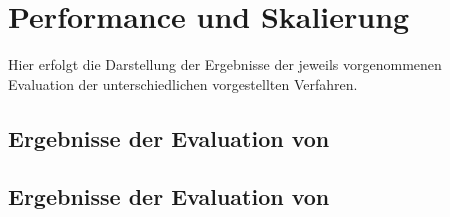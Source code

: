 \section{Performance und Skalierung} %
\label{sec:performance_und_skalierung}
Hier erfolgt die Darstellung der Ergebnisse der jeweils vorgenommenen Evaluation der unterschiedlichen vorgestellten Verfahren.

\subsection{Ergebnisse der Evaluation von \cite{collectiveKnowledge}} %
\label{sub:ergebnisse_der_evaluation_von_collectiveknowledge}


\subsection{Ergebnisse der Evaluation von \cite{ranking}} %
\label{sub:ergebnisse_der_evaluation_von_}


